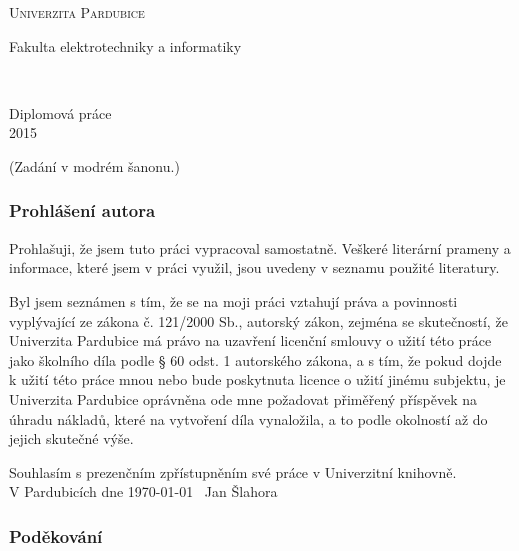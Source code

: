 \documentclass[11pt,a4paper,fleqn,titlepage,twoside,openany,export]{book}
\begin{document}
\makeatletter
\begin{titlepage}
	\begin{center}
	
	\textsc{\Huge{Univerzita Pardubice}}

	\LARGE{Fakulta elektrotechniky a informatiky}
	
	\vfill
	
	\huge{\@title}\\[2mm]
	\LARGE{\@author}
	
	\vfill

	\begin{normalsize}
	Diplomová práce\\
	2015
	\end{normalsize}
	\end{center}
\end{titlepage}


\newpage  
(Zadání v modrém šanonu.)
\thispagestyle{empty}
\hspace{0pt}

\newpage 
\thispagestyle{empty}
\hspace{0pt}

{}

\newpage 
\thispagestyle{empty}
\subsubsection*{Prohlášení autora}

Prohlašuji, že jsem tuto práci vypracoval samostatně. Veškeré literární prameny a informace, které jsem v práci využil, jsou uvedeny v seznamu použité literatury.

Byl jsem seznámen s tím, že se na moji práci vztahují práva a povinnosti vyplývající ze zákona č. 121/2000 Sb., autorský zákon, zejména se skutečností, že Univerzita Pardubice má právo na uzavření licenční smlouvy o užití této práce jako školního díla podle § 60 odst. 1 autorského zákona, a s tím, že pokud dojde k užití této práce mnou nebo bude poskytnuta licence o užití jinému subjektu, je Univerzita Pardubice oprávněna ode mne požadovat přiměřený příspěvek na úhradu nákladů, které na vytvoření díla vynaložila, a to podle okolností až do jejich skutečné výše.

Souhlasím s prezenčním zpřístupněním své práce v Univerzitní knihovně.\\[4cm]
V Pardubicích dne \today\ \hfill{} Jan Šlahora

\newpage 
\thispagestyle{empty}
\subsubsection*{Poděkování}
\end{document}

